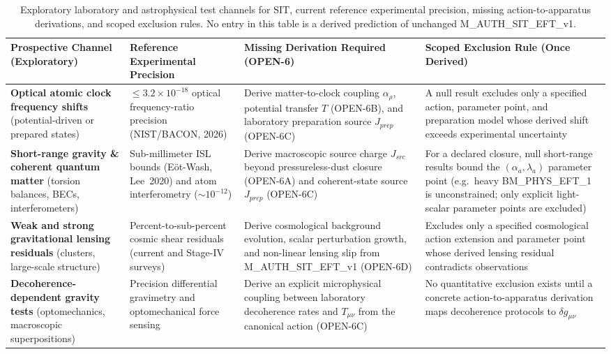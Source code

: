 \documentclass[american,11pt,letterpaper]{article}
\def\mathcal#1{#1}%
\def\mathrm#1{#1}%
\def\texttt#1{#1}%
\begin{document}
\begin{table}[htbp]
\centering
\caption{Exploratory laboratory and astrophysical test channels for SIT, current reference experimental precision, missing action-to-apparatus derivations, and scoped exclusion rules. No entry in this table is a derived prediction of unchanged \texttt{M\_AUTH\_SIT\_EFT\_v1}.}
\label{tab:exploratory-missing-derivations}
\footnotesize
\begin{tabular}{|p{3.3cm}|p{2.9cm}|p{4.2cm}|p{4.1cm}|}
\hline
\textbf{Prospective Channel (Exploratory)} & \textbf{Reference Experimental Precision} & \textbf{Missing Derivation Required (\texttt{OPEN-6})} & \textbf{Scoped Exclusion Rule (Once Derived)} \\
\hline
\textbf{Optical atomic clock frequency shifts} (potential-driven or prepared states) & $\le 3.2\times 10^{-18}$ optical frequency-ratio precision (NIST/BACON, 2026) & Derive matter-to-clock coupling $\alpha_\rho$, potential transfer $\mathcal{T}$ (\texttt{OPEN-6B}), and laboratory preparation source $J_{\mathrm{prep}}$ (\texttt{OPEN-6C}) & A null result excludes only a specified action, parameter point, and preparation model whose derived shift exceeds experimental uncertainty \\
\hline
\textbf{Short-range gravity \& coherent quantum matter} (torsion balances, BECs, interferometers) & Sub-millimeter ISL bounds (E\"ot-Wash, Lee~2020) and atom interferometry ($\sim 10^{-12}$) & Derive macroscopic source charge $J_{\mathrm{src}}$ beyond pressureless-dust closure (\texttt{OPEN-6A}) and coherent-state source $J_{\mathrm{prep}}$ (\texttt{OPEN-6C}) & For a declared closure, null short-range results bound the $(\alpha_a, \lambda_a)$ parameter point (e.g.\ heavy \texttt{BM\_PHYS\_EFT\_1} is unconstrained; only explicit light-scalar parameter points are excluded) \\
\hline
\textbf{Weak and strong gravitational lensing residuals} (clusters, large-scale structure) & Percent-to-sub-percent cosmic shear residuals (current and Stage-IV surveys) & Derive cosmological background evolution, scalar perturbation growth, and non-linear lensing slip from \texttt{M\_AUTH\_SIT\_EFT\_v1} (\texttt{OPEN-6D}) & Excludes only a specified cosmological action extension and parameter point whose derived lensing residual contradicts observations \\
\hline
\textbf{Decoherence-dependent gravity tests} (optomechanics, macroscopic superpositions) & Precision differential gravimetry and optomechanical force sensing & Derive an explicit microphysical coupling between laboratory decoherence rates and $T_{\mu\nu}$ from the canonical action (\texttt{OPEN-6C}) & No quantitative exclusion exists until a concrete action-to-apparatus derivation maps decoherence protocols to $\delta g_{\mu\nu}$ \\

\end{tabular}
\end{table}
\end{document}
